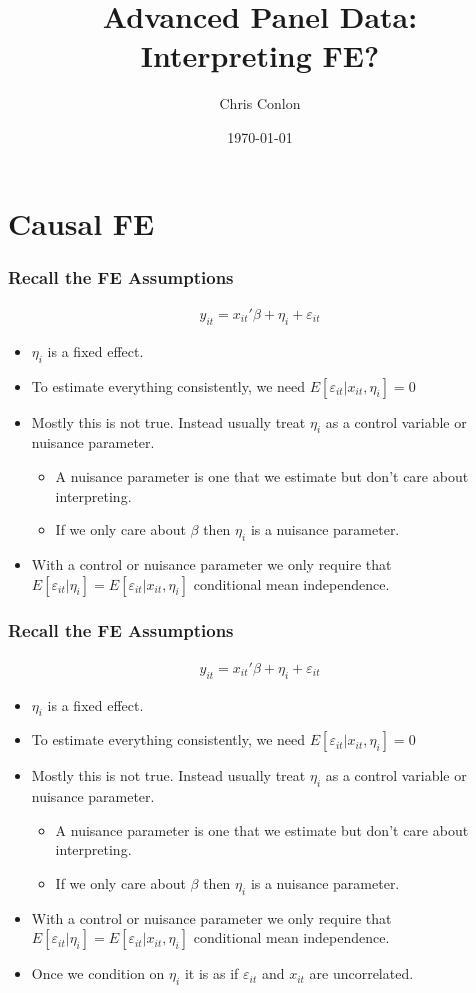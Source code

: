 \documentclass[xcolor=pdftex,dvipsnames,table,mathserif,aspectratio=169]{beamer}
\title{ Advanced Panel Data:\\
Interpreting FE?}
\author{Chris Conlon }
\institute{NYU Stern }
\date{\today}
\begin{document}
\maketitle

\section*{Causal FE}

\begin{frame}
\frametitle{Recall the FE Assumptions}
\begin{eqnarray*}
y_{it} =  x_{it}'\beta + \eta_i + \varepsilon_{it}
\end{eqnarray*}
\begin{itemize}
\item $\eta_i$ is a \alert{fixed effect}.
\item To estimate everything consistently, we need $E[ \varepsilon_{it} | x_{it}, \eta_i]=0$
\item Mostly this is not true. Instead usually treat $\eta_i$ as a \alert{control variable} or \alert{nuisance parameter}.
\begin{itemize}
\item A nuisance parameter is one that we estimate but don't care about interpreting.
\item If we only care about $\beta$ then $\eta_i$ is a nuisance parameter.
\end{itemize}
\item With a control or nuisance parameter we only require that $E[ \varepsilon_{it} | \eta_{i}]=E[ \varepsilon_{it} | x_{it}, \eta_i]$ \alert{conditional mean independence}.
\end{itemize}
\end{frame}

\begin{frame}
\frametitle{Recall the FE Assumptions}
\begin{eqnarray*}
y_{it} =  x_{it}'\beta + \eta_i + \varepsilon_{it}
\end{eqnarray*}
\begin{itemize}
\item $\eta_i$ is a \alert{fixed effect}.
\item To estimate everything consistently, we need $E[ \varepsilon_{it} | x_{it}, \eta_i]=0$
\item Mostly this is not true. Instead usually treat $\eta_i$ as a \alert{control variable} or \alert{nuisance parameter}.
\begin{itemize}
\item A nuisance parameter is one that we estimate but don't care about interpreting.
\item If we only care about $\beta$ then $\eta_i$ is a nuisance parameter.
\end{itemize}
\item With a control or nuisance parameter we only require that $E[ \varepsilon_{it} | \eta_{i}]=E[ \varepsilon_{it} | x_{it}, \eta_i]$ \alert{conditional mean independence}.
\item Once we condition on $\eta_i$ it is as if $\varepsilon_{it}$ and $x_{it}$ are uncorrelated.
\end{itemize}
\end{frame}
\end{document}

